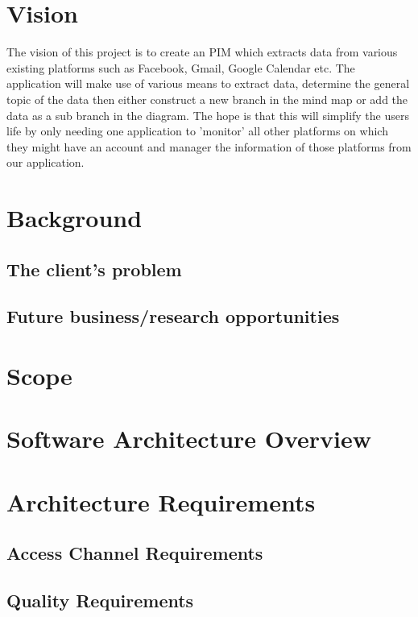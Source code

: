 \documentclass[hidelinks,english]{article}
\begin{document}
	
	\section{Vision}
	The vision of this project is to create an PIM which extracts data from various existing platforms such as Facebook, Gmail, Google Calendar etc. The application will make use of various means to extract data, determine the general topic of the data then either construct a new branch in the mind map or add the data as a sub branch in the diagram. The hope is that this will simplify the users life by only needing one application to 'monitor' all other platforms on which they might have an account and manager the information of those platforms from our application.
	
	\section{Background}
		\subsection{The client's problem}
		
		
		\subsection{Future business/research opportunities}
		
		
	\section{Scope}
	
	
	\section{Software Architecture Overview}
	
	
	\section{Architecture Requirements}
		
		\subsection{Access Channel Requirements}
		
		
		\subsection{Quality Requirements}
		
\end{document}
